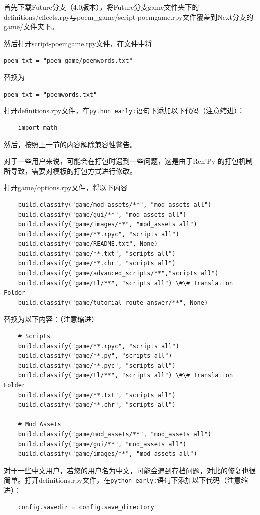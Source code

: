\documentclass[../../Main.tex]{subfiles}
\begin{document}
首先下载Future分支（4.0版本），将Future分支game文件夹下的definitions/effects.rpy与poem\_game/script-poemgame.rpy文件覆盖到Next分支的game/文件夹下。

然后打开script-poemgame.rpy文件，在文件中将

\verb|poem_txt = "poem_game/poemwords.txt"|

替换为

\verb|poem_txt = "poemwords.txt"|

打开definitions.rpy文件，在\verb|python early:|语句下添加以下代码（注意缩进）：
\begin{lstlisting}
    import math
\end{lstlisting}

然后，按照上一节的内容解除兼容性警告。

对于一些用户来说，可能会在打包时遇到一些问题，这是由于Ren'Py 的打包机制所导致，需要对模板的打包方式进行修改。

打开game/options.rpy文件，将以下内容
\begin{lstlisting}
    build.classify("game/mod_assets/**", "mod_assets all")
    build.classify("game/gui/**", "mod_assets all")
    build.classify("game/images/**", "mod_assets all")
    build.classify("game/**.rpyc", "scripts all")
    build.classify("game/README.txt", None)
    build.classify("game/**.txt", "scripts all")
    build.classify("game/**.chr", "scripts all")
    build.classify("game/advanced_scripts/**","scripts all")
    build.classify("game/tl/**", "scripts all") \#\# Translation Folder
    build.classify("game/tutorial_route_answer/**", None)
\end{lstlisting}

替换为以下内容：（注意缩进）
\begin{lstlisting}
    # Scripts
    build.classify("game/**.rpyc", "scripts all")
    build.classify("game/**.py", "scripts all")
    build.classify("game/**.pyc", "scripts all")
    build.classify("game/tl/**", "scripts all") \#\# Translation Folder
    build.classify("game/**.txt", "scripts all")
    build.classify("game/**.chr", "scripts all")

    # Mod Assets
    build.classify("game/mod_assets/**", "mod_assets all")
    build.classify("game/gui/**", "mod_assets all")
    build.classify("game/images/**", "mod_assets all")
\end{lstlisting}

对于一些中文用户，若您的用户名为中文，可能会遇到存档问题，对此的修复也很简单。打开definitions.rpy文件，在\verb|python early:|语句下添加以下代码（注意缩进）：
\begin{lstlisting}
    config.savedir = config.save_directory
\end{lstlisting}
\end{document}
